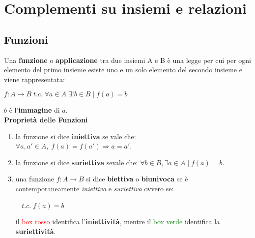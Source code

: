 \chapter{Complementi su insiemi e relazioni}

\section{Funzioni}
Una \textbf{funzione} o \textbf{applicazione} tra due insiemi A e B è una legge per cui per ogni elemento del primo insieme esiste uno e un solo elemento del secondo insieme e viene rappresentata:
\begin{center}
    $f : A \rightarrow B \; t.c. \; \forall a \in A \; \exists ! b \in B \; | \; f(a) = b$
\end{center}
$b$ è l'\textbf{immagine} di $a$. \\ \newline
\textbf{Proprietà delle Funzioni}
\begin{enumerate}[nosep]

    \item la funzione si dice \textbf{iniettiva} se vale che:  $\forall a, a' \in A, \; f(a) = f(a') \Rightarrow a = a'$.

    \item la funzione si dice \textbf{suriettiva} sevale che: $\forall b \in B, \exists a \in A \; | \; f(a) = b$.

    \item una funzione $f : A \rightarrow B$ si dice \textbf{biettiva} o \textbf{biunivoca} se è contemporaneamente \textit{iniettiva} e \textit{suriettiva} ovvero se:
        \begin{center}
             $\;$  $\; t.c. \; f(a) = b$
        \end{center}
    il \textcolor{red}{box rosso} identifica l'\textbf{iniettività}, mentre il \textcolor{green}{box verde} identifica la \textbf{suriettività}.
\end{enumerate}

\newpage
